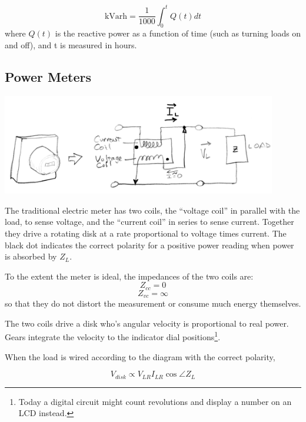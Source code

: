 \[
\text{kVarh} = \frac {1}  {1000}  \int_0^t Q(t) dt
\]
where $Q(t)$ is the reactive power as a function of time (such
as turning loads on and off), and t is measured in hours.


\subsection{Power Meters}

\begin{center}
\includegraphics[width=120mm]{figsChapt03/TS44996.png}
\end{center}


The traditional electric meter has two coils, the ``voltage coil'' in parallel
with the load, to sense voltage, and the ``current coil''
in series to sense current.   Together they drive a rotating disk at a rate proportional
to voltage times current.
The black dot indicates the correct polarity for a
positive power reading when power is absorbed by $Z_L$.


To the extent the meter is ideal, the impedances of the two coils are:
\[
Z_{cc} = 0
\]
\[
Z_{vc} = \infty
\]
so that they do not distort the measurement or consume much energy themselves.



The two coils drive a disk who's angular velocity is
proportional to real power.   Gears integrate the  velocity to the indicator dial
positions\footnote{Today a digital circuit might count revolutions and display
a number on an LCD instead.}.

When the load is wired according to the diagram with the correct polarity,

\[
V_{disk} \propto V_{LR} I_{LR} \cos \angle Z_L
\]



